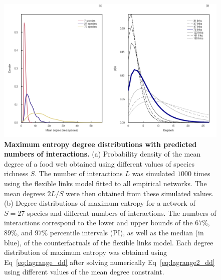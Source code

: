 \begin{figure}[!h]
  \centering
  \includegraphics[width=\textwidth]{figures/article2/maxent_degree_dist_fl.png}
  \caption{\textbf{Maximum entropy degree distributions with predicted numbers of interactions.}
  (a) Probability density of the mean degree of a food web obtained using
  different values of species richness $S$. The number of interactions $L$ was
  simulated $1000$ times using the flexible links model fitted to all empirical
  networks. The mean degrees $2L/S$ were then obtained
  from these simulated values. (b) Degree distributions of maximum entropy for a
  network of $S=27$ species and different numbers of interactions. The numbers
  of interactions correspond to the lower and upper bounds of the $67\%$,
  $89\%$, and $97\%$ percentile intervals (PI), as well as the median (in blue),
  of the counterfactuals of the flexible links model. Each degree distribution
  of maximum entropy was obtained using Eq~\ref{eq:lagrange_dd} after solving
  numerically Eq~\ref{eq:lagrange2_dd} using different values of the mean
  degree constraint.}
  \label{fig:degree_dist_fl}
\end{figure}

\clearpage




